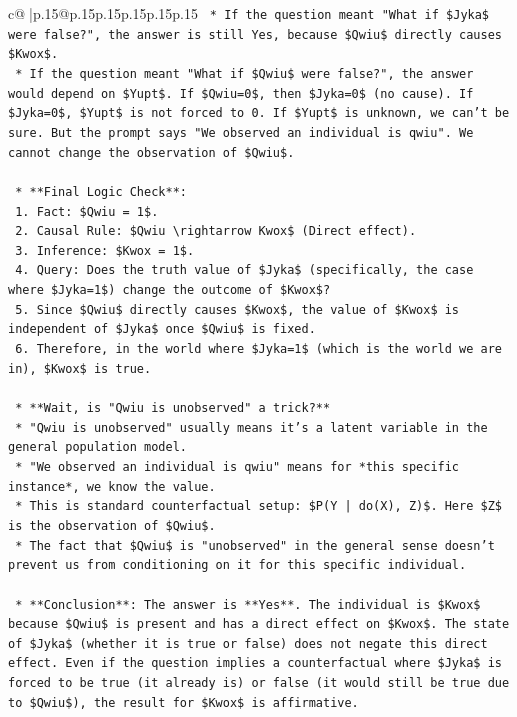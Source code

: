 \documentclass{article}
\begin{document}
{\begin{supertabular}{c@{$\;$}|p{.15\linewidth}@{}p{.15\linewidth}p{.15\linewidth}p{.15\linewidth}p{.15\linewidth}p{.15\linewidth}}
{{{\texttt{        *   If the question meant "What if \$Jyka\$ were false?", the answer is still Yes, because \$Qwiu\$ directly causes \$Kwox\$.} \\
\texttt{        *   If the question meant "What if \$Qwiu\$ were false?", the answer would depend on \$Yupt\$. If \$Qwiu=0\$, then \$Jyka=0\$ (no cause). If \$Jyka=0\$, \$Yupt\$ is not forced to 0. If \$Yupt\$ is unknown, we can't be sure. But the prompt says "We observed an individual is qwiu". We cannot change the observation of \$Qwiu\$.} \\
\\ 
\texttt{    *   **Final Logic Check**:} \\
\texttt{        1.  Fact: \$Qwiu = 1\$.} \\
\texttt{        2.  Causal Rule: \$Qwiu \textbackslash{}rightarrow Kwox\$ (Direct effect).} \\
\texttt{        3.  Inference: \$Kwox = 1\$.} \\
\texttt{        4.  Query: Does the truth value of \$Jyka\$ (specifically, the case where \$Jyka=1\$) change the outcome of \$Kwox\$?} \\
\texttt{        5.  Since \$Qwiu\$ directly causes \$Kwox\$, the value of \$Kwox\$ is independent of \$Jyka\$ once \$Qwiu\$ is fixed.} \\
\texttt{        6.  Therefore, in the world where \$Jyka=1\$ (which is the world we are in), \$Kwox\$ is true.} \\
\\ 
\texttt{    *   **Wait, is "Qwiu is unobserved" a trick?**} \\
\texttt{        *   "Qwiu is unobserved" usually means it's a latent variable in the general population model.} \\
\texttt{        *   "We observed an individual is qwiu" means for *this specific instance*, we know the value.} \\
\texttt{        *   This is standard counterfactual setup: \$P(Y | do(X), Z)\$. Here \$Z\$ is the observation of \$Qwiu\$.} \\
\texttt{        *   The fact that \$Qwiu\$ is "unobserved" in the general sense doesn't prevent us from conditioning on it for this specific individual.} \\
\\ 
\texttt{    *   **Conclusion**: The answer is **Yes**. The individual is \$Kwox\$ because \$Qwiu\$ is present and has a direct effect on \$Kwox\$. The state of \$Jyka\$ (whether it is true or false) does not negate this direct effect. Even if the question implies a counterfactual where \$Jyka\$ is forced to be true (it already is) or false (it would still be true due to \$Qwiu\$), the result for \$Kwox\$ is affirmative.} \\
}}}
\end{supertabular}}
\end{document}
